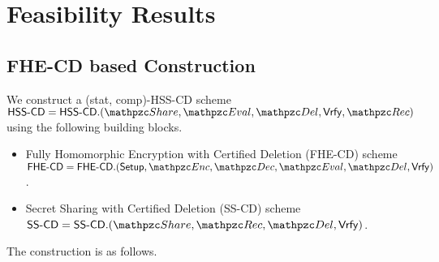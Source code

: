 \section{Feasibility Results}

\subsection{FHE-CD based Construction}

We construct a (stat, comp)-HSS-CD scheme
$\HSScd = \HSScd.(\Sh, \Ev, \Del, \Vrfy, \Rec)$ using the following
building blocks.

\begin{itemize}
\item Fully Homomorphic Encryption with Certified Deletion (FHE-CD)
scheme $\FHEcd = \FHEcd.(\Setup, \qEnc, \qDec, \\
\Ev, \Del, \Vrfy)$.

\item Secret Sharing with Certified Deletion (SS-CD) scheme $\SScd =
\SScd.(\Sh, \Rec, \Del, \Vrfy)$.
\end{itemize}

The construction is as follows.


